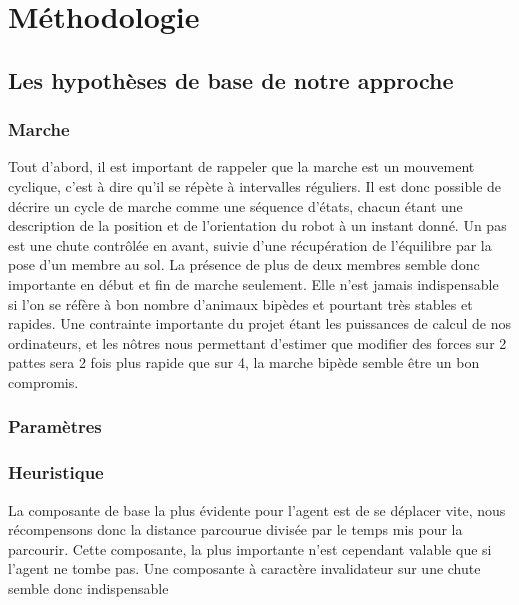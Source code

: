 \documentclass[journal, a4paper]{IEEEtran}
\begin{document}
\section{Méthodologie}\label{sec:met}
	\subsection{Les hypothèses de base de notre approche}\label{subsec:les-hypotheses-de-base-de-notre-approche}


	\subsubsection{Marche}
	Tout d'abord, il est important de rappeler que la marche est un
	mouvement cyclique, c'est à dire qu'il se répète à intervalles
	réguliers. Il est donc possible de décrire un cycle de marche
	comme une séquence d'états, chacun étant une description de la
	position et de l'orientation du robot à un instant donné.
	Un pas est une chute contrôlée en avant, suivie d'une récupération
	de l'équilibre par la pose d'un membre au sol.
	La présence de plus de deux membres semble donc importante en début
	et fin de marche seulement. Elle n'est jamais indispensable si l'on
	se réfère à bon nombre d'animaux bipèdes et pourtant très stables et
	rapides.
	Une contrainte importante du projet étant les puissances de calcul
	de nos ordinateurs, et les nôtres nous permettant d'estimer que
	modifier des forces sur 2 pattes sera 2 fois plus rapide que sur 4,
	la marche bipède semble être un bon compromis.

	\subsubsection{Paramètres}

	\subsubsection{Heuristique}

	La composante de base la plus évidente pour l'agent est de se
	déplacer vite, nous récompensons donc la distance parcourue
	divisée par le temps mis pour la parcourir. Cette composante,
	la plus importante n'est cependant valable que si l'agent ne tombe
	pas. Une composante à caractère invalidateur sur une chute semble
	donc indispensable
\end{document}

